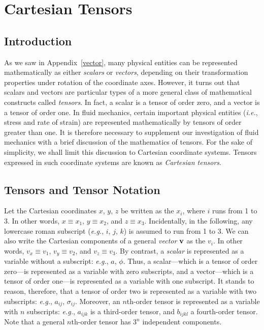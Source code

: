 \chapter{Cartesian Tensors}\label{appb}
\section{Introduction}
As we saw in Appendix~\ref{vector},  many physical entities can be represented mathematically as 
either {\em scalars}\/ or
{\em vectors}, depending on their transformation properties under rotation of the coordinate axes. 
However, it turns out that scalars and vectors are particular types of a more general class of 
mathematical constructs called {\em tensors}. In fact, a scalar is a tensor of order zero, and a vector is a tensor of
order one. In fluid mechanics, certain important physical entities ({\em i.e.}, stress and rate of strain) are represented mathematically
by  tensors of order greater than one. It is therefore necessary to supplement our investigation of fluid mechanics with a brief discussion of the mathematics
of tensors. For the sake of simplicity, we shall limit this discussion to Cartesian coordinate systems. Tensors expressed
in such  coordinate systems are known as {\em Cartesian tensors}. 

\section{Tensors and Tensor Notation}
Let the Cartesian coordinates $x$, $y$, $z$ be written as the $x_i$, where $i$ runs from 1 to 3. In other words,
$x\equiv x_1$, $y\equiv x_2$, and $z\equiv x_3$. Incidentally, in the following, any lowercase roman subscript ({\em e.g.}, $i$, $j$, $k$) is
assumed to run from 1 to 3. We can also write the Cartesian components of a general {\em vector}\/ ${\bf v}$
as the $v_i$. In other words, $v_x\equiv v_1$, $v_y\equiv v_2$, and $v_z\equiv v_3$. By contrast, a {\em scalar}\/ is represented as
a variable without a subscript: {\em e.g.}, $a$, $\phi$. Thus, a scalar---which is a tensor of order zero---is
represented as a variable with zero subscripts, and a vector---which is a tensor of order one---is
represented as a variable with one subscript. It stands to reason, therefore, that a tensor of order two is
represented as a variable with two subscripts: {\em e.g.}, $a_{ij}$, $\sigma_{ij}$. Moreover, an $n$th-order tensor is represented as a variable with $n$ subscripts: {\em e.g.}, $a_{ijk}$ is a third-order tensor, and $b_{ijkl}$  a fourth-order tensor. 
Note that a general $n$th-order tensor has $3^n$ independent components. 

